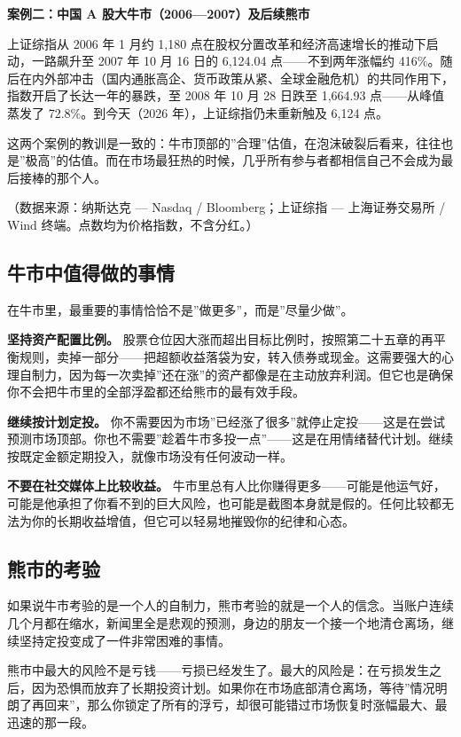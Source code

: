 \documentclass[a4paper,11pt,oneside,fontset=none,UTF8,zihao=-4]{ctexbook}
\begin{document}
\textbf{案例二：中国 A 股大牛市（2006---2007）及后续熊市}

上证综指从 2006 年 1 月约 1,180
点在股权分置改革和经济高速增长的推动下启动，一路飙升至 2007 年 10 月 16
日的 6,124.04 点------不到两年涨幅约
416\%。随后在内外部冲击（国内通胀高企、货币政策从紧、全球金融危机）的共同作用下，指数开启了长达一年的暴跌，至
2008 年 10 月 28 日跌至 1,664.93 点------从峰值蒸发了
72.8\%。到今天（2026 年），上证综指仍未重新触及 6,124 点。

这两个案例的教训是一致的：牛市顶部的''合理''估值，在泡沫破裂后看来，往往也是''极高''的估值。而在市场最狂热的时候，几乎所有参与者都相信自己不会成为最后接棒的那个人。

（数据来源：纳斯达克 --- Nasdaq / Bloomberg；上证综指 --- 上海证券交易所
/ Wind 终端。点数均为价格指数，不含分红。）

\subsection{牛市中值得做的事情}\label{ux725bux5e02ux4e2dux503cux5f97ux505aux7684ux4e8bux60c5}

在牛市里，最重要的事情恰恰不是''做更多''，而是''尽量少做''。

\textbf{坚持资产配置比例。}
股票仓位因大涨而超出目标比例时，按照第二十五章的再平衡规则，卖掉一部分------把超额收益落袋为安，转入债券或现金。这需要强大的心理自制力，因为每一次卖掉''还在涨''的资产都像是在主动放弃利润。但它也是确保你不会把牛市里的全部浮盈都还给熊市的最有效手段。

\textbf{继续按计划定投。}
你不需要因为市场''已经涨了很多''就停止定投------这是在尝试预测市场顶部。你也不需要''趁着牛市多投一点''------这是在用情绪替代计划。继续按既定金额定期投入，就像市场没有任何波动一样。

\textbf{不要在社交媒体上比较收益。}
牛市里总有人比你赚得更多------可能是他运气好，可能是他承担了你看不到的巨大风险，也可能是截图本身就是假的。任何比较都无法为你的长期收益增值，但它可以轻易地摧毁你的纪律和心态。

\subsection{熊市的考验}\label{ux718aux5e02ux7684ux8003ux9a8c}

如果说牛市考验的是一个人的自制力，熊市考验的就是一个人的信念。当账户连续几个月都在缩水，新闻里全是悲观的预测，身边的朋友一个接一个地清仓离场，继续坚持定投变成了一件非常困难的事情。

熊市中最大的风险不是亏钱------亏损已经发生了。最大的风险是：在亏损发生之后，因为恐惧而放弃了长期投资计划。如果你在市场底部清仓离场，等待''情况明朗了再回来''，那么你锁定了所有的浮亏，却很可能错过市场恢复时涨幅最大、最迅速的那一段。
\end{document}
